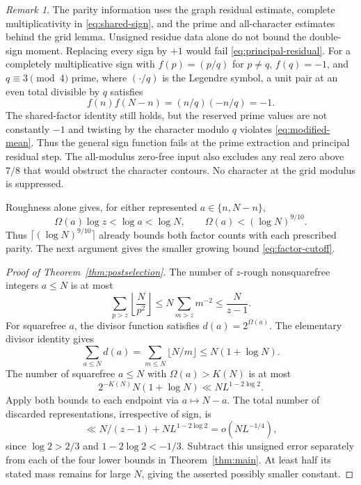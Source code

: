 \documentclass[11pt]{article}
\theoremstyle{definition}
\theoremstyle{remark}
\newtheorem{remark}[theorem]{Remark}
\begin{document}
\begin{remark}\label{rem:parity}
The parity information uses the graph residual estimate, complete
multiplicativity in \eqref{eq:shared-sign}, and the prime and
all-character estimates behind the grid lemma.
Unsigned residue data alone do not bound the double-sign moment.
Replacing every sign by $+1$ would fail
\eqref{eq:principal-residual}.
For a completely multiplicative sign with
$f(p)=(p/q)$ for $p\ne q$, $f(q)=-1$, and $q\equiv3\pmod4$ prime,
where $(\cdot/q)$ is the Legendre symbol,
a unit pair at an even total divisible by $q$ satisfies
\begin{equation}\label{eq:character-model}
f(n)f(N-n)=(n/q)(-n/q)=-1.
\end{equation} The shared-factor identity still holds, but the
reserved prime values are not constantly $-1$ and twisting by the
character modulo $q$ violates \eqref{eq:modified-mean}.
Thus the general sign function fails at the prime extraction and
principal residual step. The all-modulus zero-free input also
excludes any real zero above $7/8$ that would obstruct the character
contours. No character at the grid modulus is suppressed.
\end{remark}

Roughness alone gives, for either represented $a\in\{n,N-n\}$,
\begin{equation}\label{eq:rough-omega}
\Omega(a)\log z<\log a<\log N,\qquad
\Omega(a)<(\log N)^{9/10}.
\end{equation}
Thus $\lceil(\log N)^{9/10}\rceil$ already bounds both factor
counts with each prescribed parity. The next argument gives the
smaller growing bound \eqref{eq:factor-cutoff}.

\begin{proof}[Proof of Theorem~\ref{thm:postselection}]
The number of $z$-rough nonsquarefree integers $a\le N$ is at most
\begin{equation}\label{eq:nonsquarefree-count}
\sum_{p>z}\left\lfloor\frac N{p^2}\right\rfloor
\le N\sum_{m>z}m^{-2}\le\frac N{z-1}.
\end{equation}
For squarefree $a$, the divisor function satisfies
$d(a)=2^{\Omega(a)}$. The elementary divisor identity gives
\begin{equation}\label{eq:divisor-sum}
\sum_{a\le N}d(a)=\sum_{m\le N}\lfloor N/m\rfloor
\le N(1+\log N).
\end{equation}
The number of squarefree $a\le N$ with $\Omega(a)>K(N)$ is at most
\begin{equation}\label{eq:omega-tail}
2^{-K(N)}N(1+\log N)\ll NL^{1-2\log2}.
\end{equation}
Apply both bounds to each endpoint via $a\mapsto N-a$.
The total number of discarded representations, irrespective of sign,
is
\begin{equation}\label{eq:postselection-error}
\ll N/(z-1)+NL^{1-2\log2}=o(NL^{-1/4}),
\end{equation}
since $\log2>2/3$ and $1-2\log2<-1/3$.
Subtract this unsigned error separately from each of the four lower
bounds in Theorem~\ref{thm:main}. At least half its stated mass remains
for large $N$, giving the asserted possibly smaller constant.
\end{proof}
\end{document}
